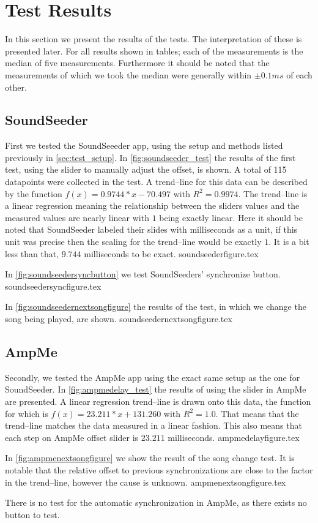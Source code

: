 \section{Test Results}
In this section we present the results of the tests.
The interpretation of these is presented later.
For all results shown in tables; each of the measurements is the median of five measurements. 
Furthermore it should be noted that the measurements of which we took the median were generally within $\pm 0.1 ms$ of each other. 

\subsection{SoundSeeder}
First we tested the SoundSeeeder app, using the setup and methods listed previously in \cref{sec:test_setup}.
In \vref{fig:soundseeder_test} the results of the first test, using the slider to manually adjust the offset, is shown. 
A total of 115 datapoints were collected in the test.
A trend--line for this data can be described by the function $f(x) = 0.9744 * x - 70.497$ with $R^2=0.9974$.
The trend--line is a linear regression meaning the relationship between the sliders values and the measured values are nearly linear with $1$ being exactly linear.
Here it should be noted that SoundSeeder labeled their slides with milliseconds as a unit, if this unit was precise then the scaling for the trend--line would be exactly $1$.
It is a bit less than that, $9.744$ milliseconds to be exact.
{soundseederfigure.tex}

In \vref{fig:soundseedersyncbutton} we test SoundSeeders' synchronize button.
{soundseedersyncfigure.tex}

In \vref{fig:soundseedernextsongfigure} the results of the test, in which we change the song being played, are shown. 
{soundseedernextsongfigure.tex}

\subsection{AmpMe}
Secondly, we tested the AmpMe app using the exact same setup as the one for SoundSeeder. 
In \vref{fig:ampmedelay_test} the results of using the slider in AmpMe are presented.
A linear regression trend--line is drawn onto this data, the function for which is $f(x) = 23.211 * x + 131.260$ with $R^2 = 1.0$.
That means that the trend--line matches the data measured in a linear fashion. 
This also means that each step on AmpMe offset slider is $23.211$ milliseconds. 
{ampmedelayfigure.tex}

In \vref{fig:ampmenextsongfigure} we show the result of the song change test. 
It is notable that the relative offset to previous synchronizations are close to the factor in the trend--line, however the cause is unknown. 
{ampmenextsongfigure.tex}

There is no test for the automatic synchronization in AmpMe, as there exists no button to test. 

